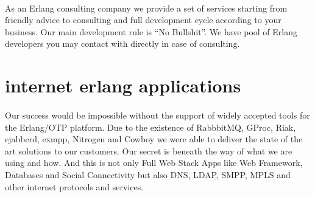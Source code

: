\documentclass[11pt]{article}
\begin{document}
\paragraph{}
As an Erlang consulting company we provide a set of services starting from friendly advice to
consulting and full development cycle according to your business.
Our main development rule is ``No Bullshit''.
We have pool of Erlang developers you may contact with directly in case of consulting.



\section*{internet erlang applications}
\paragraph{}
Our success would be impossible without the support of widely accepted tools
for the Erlang/OTP platform. Due to the existence of RabbbitMQ, GProc, Riak,
ejabberd, exmpp, Nitrogen and Cowboy we were able to deliver the state
of the art solutions to our customers. Our secret is beneath the way of
what we are using and how. And this is not only Full Web Stack Apps like Web Framework,
Databases and Social Connectivity but also DNS, LDAP, SMPP, MPLS and other internet
protocols and services.



\end{document}
